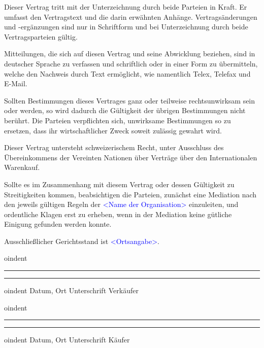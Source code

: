 \documentclass[parskip=half]{scrreprt}
\begin{document}
\begin{contract}

Dieser Vertrag tritt mit der Unterzeichnung durch beide Parteien in Kraft. Er umfasst den Vertragstext und die darin erwähnten Anhänge. Vertragsänderungen und -ergänzungen sind nur in Schriftform und bei Unterzeichnung durch beide Vertragsparteien gültig.

Mitteilungen, die sich auf diesen Vertrag und seine Abwicklung beziehen, sind in deutscher Sprache zu verfassen und schriftlich oder in einer Form zu übermitteln, welche den Nachweis durch Text ermöglicht, wie namentlich Telex, Telefax und E-Mail.




Sollten Bestimmungen dieses Vertrages ganz oder teilweise rechtsunwirksam sein oder werden, so wird dadurch die Gültigkeit der übrigen Bestimmungen nicht berührt. Die Parteien verpflichten sich, unwirksame Bestimmungen so zu ersetzen, dass ihr wirtschaftlicher Zweck soweit zulässig gewahrt wird.




Dieser Vertrag untersteht schweizerischem Recht, unter Ausschluss des Übereinkommens der Vereinten Nationen über Verträge über den Internationalen Warenkauf.




Sollte es im Zusammenhang mit diesem Vertrag oder dessen Gültigkeit zu Streitigkeiten kommen, beabsichtigen die Parteien, zunächst eine Mediation nach den jeweils gültigen Regeln der \textcolor{blue}{<Name der Organisation>} einzuleiten, und ordentliche Klagen erst zu erheben, wenn in der Mediation keine gütliche Einigung gefunden werden konnte.

Ausschließlicher Gerichtsstand ist \textcolor{blue}{<Ortsangabe>}.

\end{contract}

\vspace{50pt} 

oindent\rule{7cm}{.4pt}\hfill\rule{7cm}{.4pt}\par 

oindent Datum, Ort \hfill Unterschrift Verkäufer

\vspace{50pt} 

oindent\rule{7cm}{.4pt}\hfill\rule{7cm}{.4pt}\par 

oindent Datum, Ort \hfill Unterschrift Käufer
\end{document}
